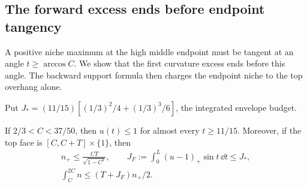 \subsection{The forward excess ends before endpoint tangency}

A positive niche maximum at the high middle endpoint must be tangent
at an angle $t\ge\arccos C$. We show that the first curvature
excess ends before this angle. The backward support formula then
charges the endpoint niche to the top overhang alone.

Put $J_*=(11/15)[(1/3)^2/4+(1/3)^3/6]$, the integrated envelope budget.

\begin{lemma}\label{lem:tilted-late-unit}
If $2/3<C<37/50$, then $u(t)\le1$ for almost every $t\ge11/15$.
Moreover, if the top face is $[C,C+T]\times\{1\}$, then
\begin{equation}\label{eq:tilted-endpoint-leakage}
 \begin{gathered}
 n_+\le\frac{CT}{\sqrt{1-C^2}},\qquad
 J_F:=\int_0^L(u-1)_+\sin t\,\dd t\le J_*,\\
 \int_C^{2C}n\le(T+J_F)n_+/2.
 \end{gathered}
\end{equation}
\end{lemma}
